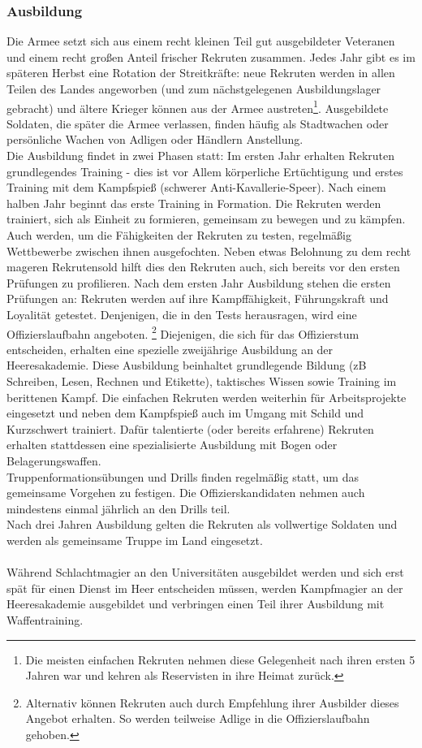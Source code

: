 \subsubsection{Ausbildung}
Die Armee setzt sich aus einem recht kleinen Teil gut ausgebildeter Veteranen und einem recht großen Anteil frischer Rekruten zusammen. 
Jedes Jahr gibt es im späteren Herbst eine Rotation der Streitkräfte: neue Rekruten werden in allen Teilen des Landes angeworben 
(und zum nächstgelegenen Ausbildungslager gebracht) und ältere Krieger können aus der Armee austreten\footnote{Die meisten einfachen Rekruten 
nehmen diese Gelegenheit nach ihren ersten 5 Jahren war und kehren als Reservisten in ihre Heimat zurück.}. Ausgebildete Soldaten, die später die Armee verlassen, 
finden häufig als Stadtwachen oder persönliche Wachen von Adligen oder Händlern Anstellung.\\
Die Ausbildung findet in zwei Phasen statt: Im ersten Jahr erhalten Rekruten grundlegendes Training - dies ist vor Allem körperliche 
Ertüchtigung und erstes Training mit dem Kampfspieß (schwerer Anti-Kavallerie-Speer). 
Nach einem halben Jahr beginnt das erste Training in Formation. Die Rekruten werden trainiert, sich als Einheit zu formieren, gemeinsam zu bewegen und zu kämpfen. 
Auch werden, um die Fähigkeiten der Rekruten zu testen, regelmäßig Wettbewerbe zwischen ihnen ausgefochten. 
Neben etwas Belohnung zu dem recht mageren Rekrutensold hilft dies den Rekruten auch, sich bereits vor den ersten Prüfungen zu profilieren.
Nach dem ersten Jahr Ausbildung stehen die ersten Prüfungen an: Rekruten werden auf ihre Kampffähigkeit, Führungskraft und Loyalität getestet. 
Denjenigen, die in den Tests herausragen, wird eine Offizierslaufbahn angeboten.
\footnote{Alternativ können Rekruten auch durch Empfehlung ihrer Ausbilder dieses Angebot erhalten. So werden teilweise Adlige in die Offizierslaufbahn gehoben.} 
Diejenigen, die sich für das Offizierstum entscheiden, erhalten eine spezielle zweijährige Ausbildung an der Heeresakademie. 
Diese Ausbildung beinhaltet grundlegende Bildung (zB Schreiben, Lesen, Rechnen und Etikette), taktisches Wissen sowie Training im berittenen Kampf. 
Die einfachen Rekruten werden weiterhin für Arbeitsprojekte eingesetzt und neben dem Kampfspieß auch im Umgang mit Schild und Kurzschwert trainiert. 
Dafür talentierte (oder bereits erfahrene) Rekruten erhalten stattdessen eine spezialisierte Ausbildung mit Bogen oder Belagerungswaffen.\\
Truppenformationsübungen und Drills finden regelmäßig statt, um das gemeinsame Vorgehen zu festigen. 
Die Offizierskandidaten nehmen auch mindestens einmal jährlich an den Drills teil. \\
Nach drei Jahren Ausbildung gelten die Rekruten als vollwertige Soldaten und werden als gemeinsame Truppe im Land eingesetzt.\\~\\
Während Schlachtmagier an den Universitäten ausgebildet werden und sich erst spät für einen Dienst im Heer entscheiden müssen, werden Kampfmagier an der Heeresakademie ausgebildet 
und verbringen einen Teil ihrer Ausbildung mit Waffentraining.

